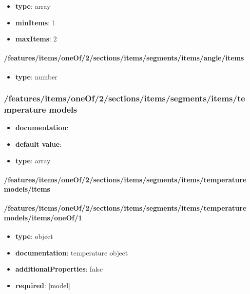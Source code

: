 \begin{itemize}\item {\bf type}: array
\item {\bf minItems}: 1
\item {\bf maxItems}: 2
\end{itemize}\paragraph{/features/items/oneOf/2/sections/items/segments/items/angle/items}
\begin{itemize}\item {\bf type}: number
\end{itemize}\subsubsection{/features/items/oneOf/2/sections/items/segments/items/temperature models}
\begin{itemize}\item {\bf documentation}: 
\item {\bf default value}: 
\item {\bf type}: array
\end{itemize}\paragraph{/features/items/oneOf/2/sections/items/segments/items/temperature models/items}

\paragraph{/features/items/oneOf/2/sections/items/segments/items/temperature models/items/oneOf/1}
\begin{itemize}\item {\bf type}: object
\item {\bf documentation}: temperature object
\item {\bf additionalProperties}: false
\item {\bf required}: [model]\end{itemize}
